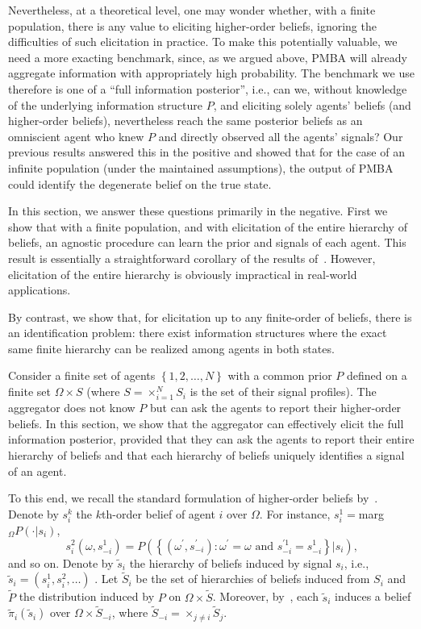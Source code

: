 \documentclass[12pt,reqno]{amsart}
\begin{document}
Nevertheless, at a theoretical level, one may wonder whether, with a finite population, there is any value to eliciting higher-order beliefs, ignoring the difficulties of such elicitation in practice. To make this potentially valuable, we need a more exacting benchmark, since, as we argued above, PMBA will already aggregate information with appropriately high probability. The benchmark we use therefore is one of a ``full information posterior'', i.e., can we, without knowledge of the underlying information structure $P$, and eliciting solely agents' beliefs (and higher-order beliefs), nevertheless reach the same posterior beliefs as an omniscient agent who knew $P$ and directly observed all the agents' signals? Our previous results answered this in the positive and showed that for the case of an infinite population (under the maintained assumptions), the output of PMBA could identify the degenerate belief on the true state.

In this section, we answer these questions primarily in the negative. First we show that with a finite population, and with elicitation of the entire hierarchy of beliefs, an agnostic procedure can learn the prior and signals of each agent. This result is essentially a straightforward corollary of the results of~\cite{mertens2015repeated}. However, elicitation of the entire hierarchy is obviously impractical in real-world applications. 

By contrast, we show that, for elicitation up to any finite-order of beliefs, there is an identification problem: there exist information structures where the exact same finite hierarchy can be realized among agents in both states. 


Consider a finite set of agents $\left\{ 1,2,\ldots,N\right\} $ with a common
prior $P$ defined on a finite set $\Omega \times S$ (where $S=\times
_{i=1}^{N}S_{i}$ is the set of their signal profiles). The aggregator does not
know $P$ but can ask the agents to report their higher-order beliefs. In this section, we show that the aggregator can effectively elicit the full information posterior, provided that they can ask the agents to report their entire hierarchy of beliefs and that each hierarchy of beliefs uniquely identifies a signal of an agent. 

To this end, we recall the standard formulation of higher-order beliefs by~\cite{mertens1985formulation}. Denote by $s_{i}^{k}$ the $k$th-order belief of agent $i$ over $\Omega$.
For instance, $s_{i}^{1}=$marg$_{\Omega }P \left( \cdot |s_{i}\right) $, 
\[s_{i}^{2}\left( \omega ,s_{-i}^{1}\right) =P \left( \left\{ \left( \omega
^{\prime },s_{-i}^{\prime }\right) :\omega ^{\prime }=\omega \text{ and }%
s_{-i}^{\prime 1}=s_{-i}^{1}\right\} |s_{i}\right) \text{,}
\]%
and so on. Denote by $\tilde{s}_{i}$ the hierarchy of beliefs induced by
signal $s_{i}$, i.e., $\tilde{s}_{i}=\left( s_{i}^{1},s_{i}^{2},\ldots\right) $%
. Let $\tilde{S}_{i}$ be the set of hierarchies of beliefs induced from $%
S_{i}$ and $\tilde{P}$ the distribution induced by $P$ on $\Omega
\times \tilde{S}$. Moreover, by~\cite{mertens1985formulation}, each $\tilde{s}_{i}
$ induces a belief $\tilde{\pi}_{i}\left( \tilde{s}_{i}\right) $ over $%
\Omega \times \tilde{S}_{-i}$, where $\tilde{S}_{-i}=\times_{j\neq i}\tilde{S}_{j}$.
\end{document}
